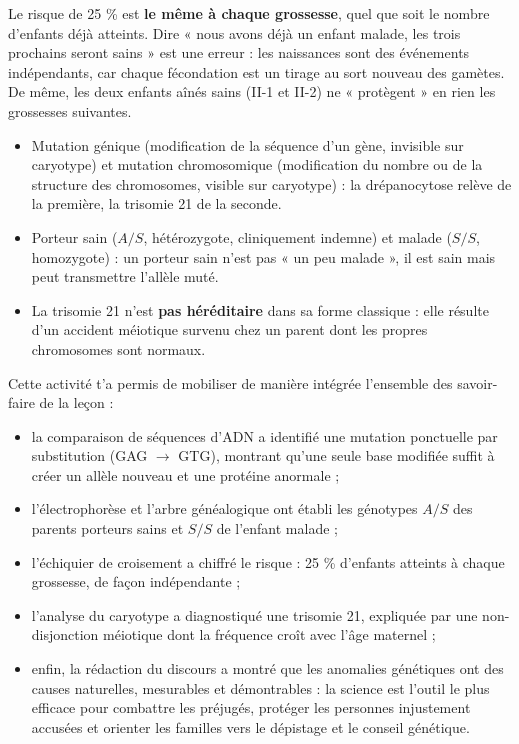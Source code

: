 \documentclass[11pt]{article}
\newcommand{\cle}[1]{{\popxbold\color{popdark}#1}}
\newcounter{popsec}
\newcounter{popsub}
\newcommand{\courssub}[1]{%
  \stepcounter{popsub}%
  \par\vspace{9pt}\noindent{\popxbold\fontsize{11.5}{13}\selectfont\color{popink}{\color{poporange}\thepopsec.\thepopsub}\hspace{6pt}#1}\par\nopagebreak\vspace{4pt}
}
\begin{document}
\begin{attention}
Le risque de 25 \% est \textbf{le même à chaque grossesse}, quel que soit le nombre d'enfants déjà atteints. Dire « nous avons déjà un enfant malade, les trois prochains seront sains » est une erreur : les naissances sont des événements indépendants, car chaque fécondation est un tirage au sort nouveau des gamètes. De même, les deux enfants aînés sains (II-1 et II-2) ne « protègent » en rien les grossesses suivantes.
\end{attention}

\begin{attention}
\begin{itemize}
\item \cle{Mutation génique} (modification de la séquence d'un gène, invisible sur caryotype) et \cle{mutation chromosomique} (modification du nombre ou de la structure des chromosomes, visible sur caryotype) : la drépanocytose relève de la première, la trisomie 21 de la seconde.
\item \cle{Porteur sain} ($A/S$, hétérozygote, cliniquement indemne) et \cle{malade} ($S/S$, homozygote) : un porteur sain n'est pas « un peu malade », il est sain mais peut transmettre l'allèle muté.
\item La trisomie 21 n'est \textbf{pas héréditaire} dans sa forme classique : elle résulte d'un accident méiotique survenu chez un parent dont les propres chromosomes sont normaux.
\end{itemize}
\end{attention}

\courssub{Bilan de l'activité}

Cette activité t'a permis de mobiliser de manière intégrée l'ensemble des savoir-faire de la leçon :
\begin{itemize}
\item la \cle{comparaison de séquences d'ADN} a identifié une mutation ponctuelle par substitution (GAG $\rightarrow$ GTG), montrant qu'une seule base modifiée suffit à créer un allèle nouveau et une protéine anormale ;
\item l'\cle{électrophorèse} et l'arbre généalogique ont établi les génotypes $A/S$ des parents porteurs sains et $S/S$ de l'enfant malade ;
\item l'\cle{échiquier de croisement} a chiffré le risque : 25 \% d'enfants atteints à chaque grossesse, de façon indépendante ;
\item l'analyse du \cle{caryotype} a diagnostiqué une trisomie 21, expliquée par une non-disjonction méiotique dont la fréquence croît avec l'âge maternel ;
\item enfin, la rédaction du discours a montré que les anomalies génétiques ont des \cle{causes naturelles, mesurables et démontrables} : la science est l'outil le plus efficace pour combattre les préjugés, protéger les personnes injustement accusées et orienter les familles vers le dépistage et le conseil génétique.
\end{itemize}
\end{document}
